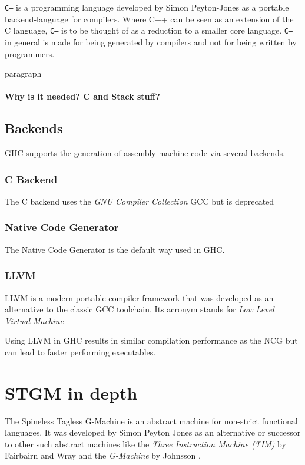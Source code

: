 \documentclass[runningheads]{llncs}
\begin{document}
\texttt{C--} is a programming language developed by Simon Peyton-Jones as a portable backend-language for compilers. Where C++ can be seen as an extension of the C language, \texttt{C--} is to be thought of as a reduction to a smaller core language. \texttt{C--} in general is made for being generated by compilers and not for being written by programmers. \cite{jones1999c}

paragraph



\paragraph{Why is it needed? C and Stack stuff?}


\subsection{Backends}
GHC supports the generation of assembly machine code via several backends.


\subsubsection{C Backend}
The C backend uses the \textit{GNU Compiler Collection} GCC but is deprecated

\subsubsection{Native Code Generator}
The Native Code Generator is the default way used in GHC.

\subsubsection{LLVM}
LLVM is a modern portable compiler framework that was developed as an alternative to the classic GCC toolchain. Its acronym stands for \textit{Low Level Virtual Machine} \cite{lattner2004llvm}

Using LLVM in GHC results in similar compilation performance as the NCG but can lead to faster performing executables.

\section{STGM in depth}
\label{sec:stgm}

The Spineless Tagless G-Machine is an abstract machine for non-strict functional languages.
It was developed by Simon Peyton Jones as an alternative or successor to other such abstract machines like the \textit{Three Instruction Machine (TIM)} by Fairbairn and Wray \cite{fairbairn1987tim} and the \textit{G-Machine} by Johnsson \cite{johnsson1984efficient}.
\end{document}
